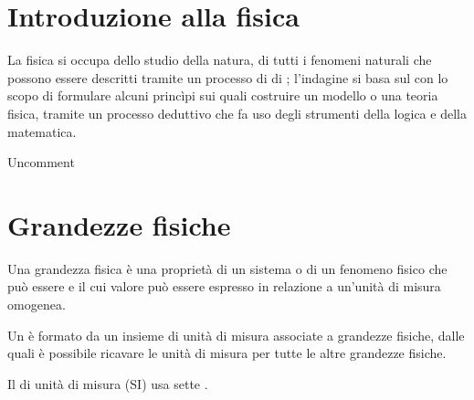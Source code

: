\documentclass[letterpaper,10pt,italian]{jupyterBook}
\begin{document}
\sphinxstepscope


\chapter{Introduzione alla fisica}
\label{\detokenize{ch/intro:introduzione-alla-fisica}}\label{\detokenize{ch/intro:physics-hs-intro}}\label{\detokenize{ch/intro::doc}}
\sphinxAtStartPar
La fisica si occupa dello studio della natura, di tutti i fenomeni naturali che possono essere descritti tramite un processo di  di ; l’indagine si basa sul  con lo scopo di formulare alcuni princìpi sui quali costruire un modello o una teoria fisica, tramite un processo deduttivo che fa uso degli strumenti della logica e della matematica.

\sphinxAtStartPar
Uncomment



\sphinxstepscope


\chapter{Grandezze fisiche}
\label{\detokenize{ch/intro/physical_quantities:grandezze-fisiche}}\label{\detokenize{ch/intro/physical_quantities:physics-hs-intro-physical-quantities}}\label{\detokenize{ch/intro/physical_quantities::doc}}
\sphinxAtStartPar
Una grandezza fisica è una proprietà di un sistema o di un fenomeno fisico che può essere {\hyperref[\detokenize{ch/intro/measurements:physics-hs-intro-measurements}]{}} e il cui valore può essere espresso in relazione a un’unità di misura omogenea.

\sphinxAtStartPar
Un  è formato da un insieme di unità di misura  associate a grandezze fisiche, dalle quali è possibile ricavare le unità di misura  per tutte le altre grandezze fisiche.

\sphinxAtStartPar
Il  di unità di misura (SI) usa sette .
\end{document}

